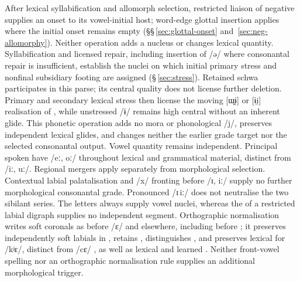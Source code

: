 After lexical syllabification and allomorph selection, restricted liaison
of negative  supplies an onset to its vowel-initial host;
word-edge glottal insertion applies where the initial onset remains empty
(§§\,\ref{sec:glottal-onset} and~\ref{sec:neg-allomorphy}). Neither
operation adds a nucleus or changes lexical quantity.
Syllabification and licensed repair, including insertion of  /ə/
where consonantal repair is insufficient, establish the nuclei on which
initial primary stress and nonfinal subsidiary footing are assigned
(§\,\ref{sec:stress}). Retained schwa participates in this parse; its
central quality does not license further deletion. Primary and secondary
lexical stress then license the moving [ɯ̯ɨ] or [ɨi̯] realisation of
, while unstressed /ɨ/ remains high central without an inherent
glide. This phonetic operation adds no mora or phonological /j/, preserves
independent lexical glides, and changes neither the earlier grade target
nor the selected consonantal output. Vowel quantity remains independent.
Principal spoken  have /eː, oː/ throughout
lexical and grammatical material, distinct from  /iː, uː/.
Regional mergers apply separately from morphological selection.
Contextual labial palatalisation and /x/ fronting before /ɪ, iː/
supply no further morphological consonantal grade.
Pronounced /ɪ\,iː/ does not neutralise the two sibilant
series. The letters  always supply vowel nuclei, whereas the
 of a restricted labial digraph supplies no independent segment.
Orthographic normalisation writes soft coronals as 
before /ɛ/ and  elsewhere, including before ;
it preserves independently soft labials in ,
retains ,
distinguishes , and preserves lexical  for /kʲɛ/,
distinct from /cɛ/ , as well as lexical  and learned .
Neither front-vowel spelling nor an
orthographic normalisation rule supplies an additional morphological trigger.
